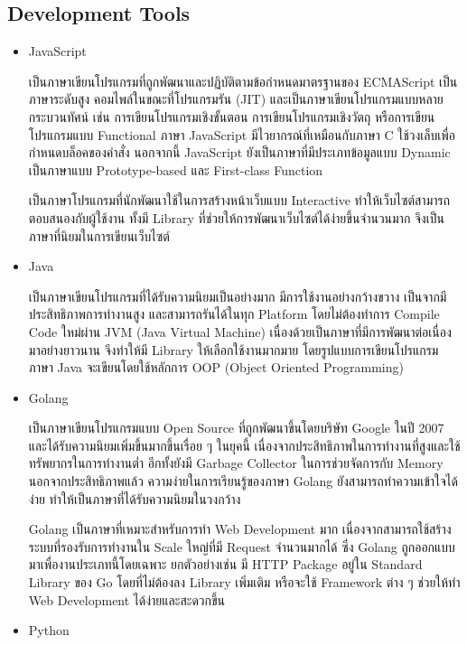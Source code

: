 \documentclass[12pt,oneside,openright,a4paper]{cpe-thai-project}
\begin{document}
  \subsection{Development Tools}
    \begin{itemize}
      \item  JavaScript 
      
        \hspace{1cm}เป็นภาษาเขียนโปรแกรมที่ถูกพัฒนาและปฏิบัติตามข้อกำหนดมาตรฐานของ ECMAScript 
        เป็นภาษาระดับสูง คอมไพล์ในขณะที่โปรแกรมรัน (JIT) 
        และเป็นภาษาเขียนโปรแกรมแบบหลายกระบวนทัศน์ เช่น 
        การเขียนโปรแกรมเชิงขั้นตอน การเขียนโปรแกรมเชิงวัตถุ หรือการเขียนโปรแกรมแบบ Functional 
        ภาษา JavaScript มีไวยากรณ์ที่เหมือนกับภาษา C ใช้วงเล็บเพื่อกำหนดบล็อคของคำสั่ง 
        นอกจากนี้ JavaScript ยังเป็นภาษาที่มีประเภทข้อมูลแบบ Dynamic 
        เป็นภาษาแบบ Prototype-based และ First-class Function  \cite{js} 
        
        \hspace{1cm}เป็นภาษาโปรแกรมที่นักพัฒนาใช้ในการสร้างหน้าเว็บแบบ Interactive 
        ทำให้เว็บไซต์สามารถตอบสนองกับผู้ใช้งาน 
        ทั้งมี Library ที่ช่วยให้การพัฒนาเว็บไซต์ได้ง่ายขึ้นจำนวนมาก 
        จึงเป็นภาษาที่นิยมในการเขียนเว็บไซต์
      \item Java
      
        \hspace{1cm}เป็นภาษาเขียนโปรแกรมที่ได้รับความนิยมเป็นอย่างมาก มีการใช้งานอย่างกว้างขวาง เป็นจากมีประสิทธิภาพการทำงานสูง และสามารถรันได้ในทุก Platform 
        โดยไม่ต้องทำการ Compile Code ใหม่ผ่าน JVM (Java Virtual Machine) เนื่องด้วยเป็นภาษาที่มีการพัฒนาต่อเนื่องมาอย่างยาวนาน 
        จึงทำให้มี Library ให้เลือกใช้งานมากมาย โดยรูปแบบการเขียนโปรแกรมภาษา Java จะเขียนโดยใช้หลักการ OOP (Object Oriented Programming) \cite{java}
      \item  Golang
      
      \hspace{1cm}เป็นภาษาเขียนโปรแกรมแบบ Open Source ที่ถูกพัฒนาขึ้นโดยบริษัท Google ในปี 2007 
      และได้รับความนิยมเพิ่มขึ้นมากขึ้นเรื่อย ๆ ในยุคนี้ \cite{go} เนื่องจากประสิทธิภาพในการทำงานที่สูงและใช้ทรัพยากรในการทำงานต่ำ 
      อีกทั้งยังมี Garbage Collector ในการช่วยจัดการกับ Memory 
      นอกจากประสิทธิภาพแล้ว ความง่ายในการเรียนรู้ของภาษา Golang 
      ยังสามารถทำความเข้าใจได้ง่าย ทำให้เป็นภาษาที่ได้รับความนิยมในวงกว้าง 
      
      \hspace{1cm}Golang เป็นภาษาที่เหมาะสำหรับการทำ Web Development มาก เนื่องจากสามารถใช้สร้างระบบที่รองรับการทำงานใน Scale ใหญ่ที่มี Request จำนวนมากได้ 
      ซึ่ง Golang ถูกออกแบบมาเพื่องานประเภทนี้โดยเฉพาะ ยกตัวอย่างเช่น มี HTTP Package อยู่ใน Standard Library ของ Go โดยที่ไม่ต้องลง Library เพิ่มเติม 
      หรือจะใช้ Framework ต่าง ๆ ช่วยให้ทำ Web Development ได้ง่ายและสะดวกขึ้น \cite{go}
      \item  Python
      

\end{itemize}
\end{document}
